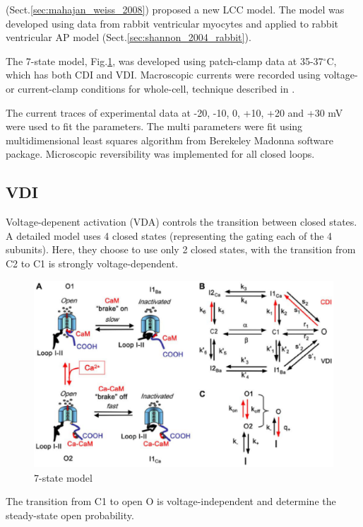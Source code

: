 \citep{mahajan2008} (Sect.\ref{sec:mahajan_weiss_2008}) proposed a new LCC
model.  The model was developed using data from rabbit ventricular myocytes and
applied to \citep{shannon2004} rabbit ventricular AP model
(Sect.\ref{sec:shannon_2004_rabbit}).

The 7-state model, Fig.\ref{fig:LCC_Mahajan08}, was developed using patch-clamp
data at 35-37$^\circ$C, which has both CDI and VDI. Macroscopic currents were
recorded using voltage- or current-clamp conditions for whole-cell, technique
described in \citep{rae1991}. 

The current traces of experimental data at -20, -10, 0, +10, +20 and +30 mV were
used to fit the parameters. The multi parameters were fit using multidimensional
least squares algorithm from Berekeley Madonna software package. Microscopic
reversibility was implemented for all closed loops.

\subsection{VDI}

Voltage-depenent activation (VDA) controls the transition between closed states.
A detailed model uses 4 closed states (representing the gating each of the 4
subunits). Here, they choose to use only 2 closed states, with the transition
from C2 to C1 is strongly voltage-dependent.

\begin{figure}[hbt]
  \centerline{\includegraphics[height=7cm,
    angle=0]{./images/LCC_Mahajan08.eps}}
  \caption{7-state model}
  \label{fig:LCC_Mahajan08}
\end{figure}

The transition from C1 to open O is voltage-independent and determine the
steady-state open probability.





